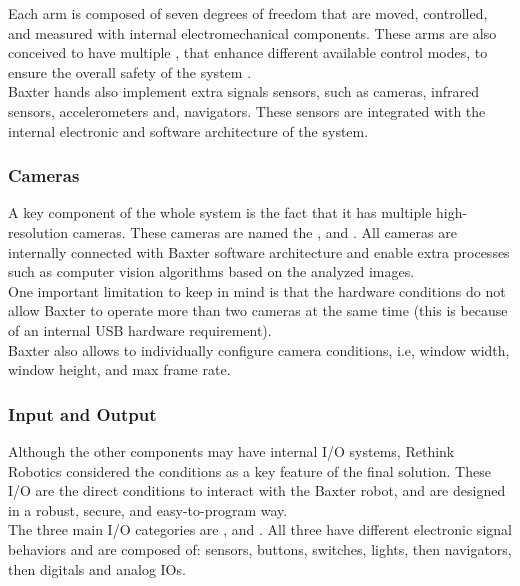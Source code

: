 \documentclass[11pt]{report} %
\begin{document}
Each arm is composed of seven degrees of freedom that are moved, controlled, and measured with internal electromechanical components. These arms are also conceived to have multiple , that enhance different available control modes, to ensure the overall safety of the system \citep{cite_baxter_arms_wiki}.\\

Baxter hands also implement extra signals sensors, such as cameras, infrared sensors, accelerometers and, navigators. These sensors are integrated with the internal electronic and software architecture of the system.\\


\subsubsection{Cameras}

A key component of the whole system is the fact that it has multiple high-resolution cameras. These cameras are named the ,  and . All cameras are internally connected with Baxter software architecture and enable extra processes such as computer vision algorithms based on the analyzed images.\\

One important limitation to keep in mind is that the hardware conditions do not allow Baxter to operate more than two cameras at the same time (this is because of an internal USB hardware requirement).\\

Baxter also allows to individually configure camera conditions, i.e, window width, window height, and max frame rate.\\


\subsubsection{Input and Output}

Although the other components may have internal I/O systems, Rethink Robotics considered the  conditions as a key feature of the final solution. These I/O are the direct conditions to interact with the Baxter robot, and are designed in a robust, secure, and easy-to-program way.\\

The three main I/O categories are ,  and  \citep{cite_baxter_io_wiki}. All three have different electronic signal behaviors and are composed of: sensors, buttons, switches, lights, then navigators, then digitals and analog IOs.\\
\end{document}
